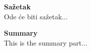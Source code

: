 { \fontsize{16pt}{12pt}\selectfont\bfseries Sažetak}\\
Ode će biti sažetak...





{ \fontsize{16pt}{12pt}\selectfont\bfseries Summary}\\
This is the summary part...
